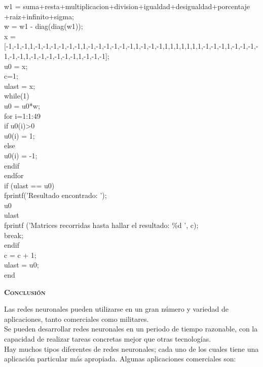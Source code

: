 \documentclass[letterpaper,12pt]{article}
\begin{document}
\begin{tcolorbox}
[colback=red!5!white,colframe=red!75!black,width=15cm ,fonttitle=\bfseries,title=Código  Hopfield Matlab ]
w1 = suma+resta+multiplicacion+division+igualdad+desigualdad+porcentaje\\+raiz+infinito+sigma;\\

w = w1 - diag(diag(w1));\\

x = 
[-1,-1,-1,1,-1,-1,-1,-1,-1,-1,1,-1,-1,-1,-1,-1,-1,1,-1,-1,-1,1,1,1,1,1,1,1,-1,-1,-1,1,-1,-1,-1,-1,-1,-1,1,-1,-1,-1,-1,-1,-1,1,-1,-1,-1];\\       
u0 = x;\\
c=1;\\

ulast = x;\\

while(1)\\
  u0 = u0*w;\\
  
  for i=1:1:49\\
    if u0(i)>0\\
      u0(i) = 1;\\
     else\\
      u0(i) = -1;\\
     endif\\
  endfor\\
  
  if (ulast == u0)\\
        
        fprintf('Resultado encontrado: ');\\
        u0\\
        ulast\\
        
      fprintf ('Matrices recorridas hasta hallar el resultado: \%d ', c);\\
     break;  \\
  endif\\

  c = c + 1;\\
  ulast = u0;\\
end\\
\end{tcolorbox}
\newpage
{\scshape\LARGE \textbf{Conclusión} \par}

Las redes neuronales pueden utilizarse en un gran número y variedad de 
aplicaciones, tanto comerciales como militares. \\
Se pueden desarrollar redes neuronales en un periodo de tiempo razonable, con 
la capacidad de realizar tareas concretas mejor que otras tecnologías.\\
 Hay muchos tipos diferentes de redes neuronales; cada uno de los cuales tiene 
una aplicación particular más apropiada. Algunas aplicaciones comerciales son:
\end{document}
